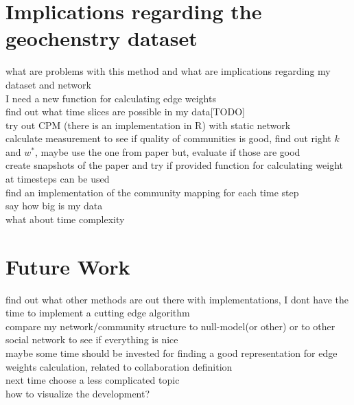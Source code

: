 \documentclass[runningheads,a4paper]{llncs}
\begin{document}
\section{Implications regarding the geochenstry dataset}
what are problems with this method and what are implications regarding my dataset and network\\
I need a new function for calculating edge weights\\
find out what time slices are possible in my data[TODO]\\
try out CPM (there is an implementation in R) with static network\\
calculate measurement to see if quality of communities is good, find out right $k$ and $w^*$, maybe use the one from paper but, evaluate if those are good\\
create snapshots of the paper and try if provided function for calculating weight at timesteps can be used\\
find an implementation of the community mapping for each time step\\

say how big is my data\\
what about time complexity\\

\section{Future Work}
find out what other methods are out there with implementations, I dont have the time to implement a cutting edge algorithm\\
compare my network/community structure to null-model(or other) or to other social network to see if everything is nice\\
maybe some time should be invested for finding a good representation for edge weights calculation, related to collaboration definition\\
next time choose a less complicated topic\\
how to visualize the development?

{
	
	
}
\end{document}

